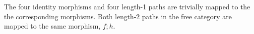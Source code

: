 The four identity morphisms and four length-1 paths are trivially mapped to the the corresponding morphisms.  Both length-2 paths in the free category are mapped to the same morphism, $f;h$.
